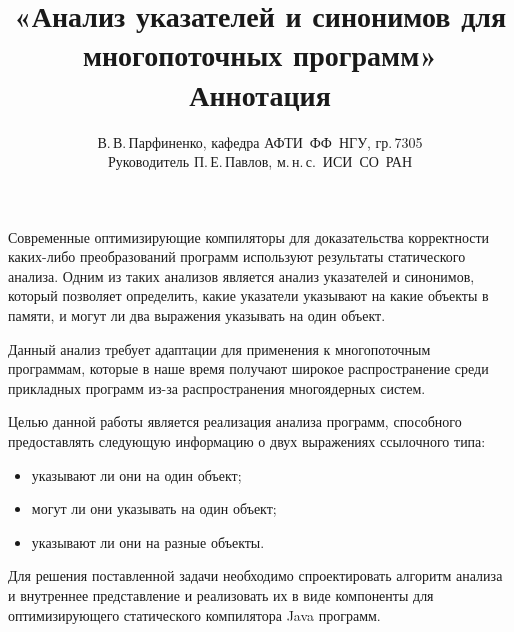 \documentclass[12pt]{article}
\title{
  «Анализ указателей и синонимов для многопоточных программ»\\
  Аннотация
}
\author{
  В.\,В.\,Парфиненко, кафедра АФТИ~ФФ~НГУ, гр.\,7305\\
  Руководитель П.\,Е.\,Павлов, м.\,н.\,с.~ИСИ~СО~РАН
}
\begin{document}
  \maketitle

  \thispagestyle{empty}

    Современные оптимизирующие компиляторы для доказательства корректности
    каких-либо преобразований программ используют результаты
    статического анализа. Одним из таких анализов является анализ
    указателей и синонимов, который позволяет определить, какие указатели
    указывают на какие объекты в памяти, и могут ли два выражения указывать
    на один объект.  

    Данный анализ требует адаптации для применения к многопоточным
    программам, которые в наше время получают широкое распространение среди
    прикладных программ из-за распространения многоядерных систем.

    Целью данной работы является реализация анализа программ,
    способного предоставлять следующую информацию о двух выражениях
    ссылочного типа:
    \begin{itemize}
      \item указывают ли они на один объект;
      \item могут ли они указывать на один объект;
      \item указывают ли они на разные объекты.
    \end{itemize}
    
    Для решения поставленной задачи необходимо спроектировать алгоритм
    анализа и внутреннее представление и реализовать их в виде компоненты
    для оптимизирующего статического компилятора Java программ.
\end{document}
